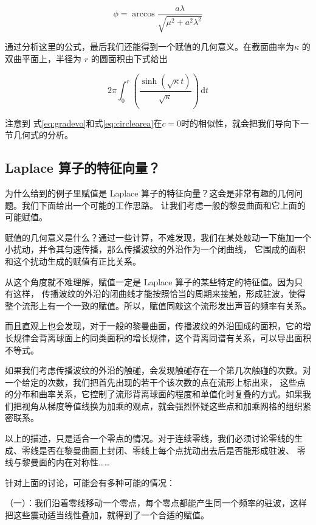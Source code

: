 \documentclass[a4paper,12pt]{article}
\numberwithin{problem}{section}
\numberwithin{definition}{section}
\numberwithin{lemma}{section}
\numberwithin{proposition}{section}
\numberwithin{theorem}{section}
\numberwithin{grammar}{section}
\numberwithin{program}{section}
\numberwithin{convention}{section}
\numberwithin{corollary}{section}
\begin{document}
\begin{equation}
    \phi = \arccos \frac{a \lambda}{\sqrt {\mu^2 + a^2 \lambda^2}}\label {eq:mulitiplcativeline}
\end{equation}

通过分析这里的公式，最后我们还能得到一个赋值的几何意义。在截面曲率为$\kappa$ 的双曲平面上，半径为 $r$ 的圆面积由下式给出

\begin{equation}
2 \pi \int_0^r \left(\frac{\sinh(\sqrt{\kappa} t)}{\sqrt{\kappa}}\right) \, \mathrm{d}t\label{eq:circlearea}
\end{equation}

注意到 式\ref{eq:gradevo}和式\ref{eq:circlearea}在$c=0$时的相似性，就会把我们导向下一节几何式的分析。

\subsection{Laplace 算子的特征向量？}

为什么给到的例子里赋值是 Laplace 算子的特征向量？这会是非常有趣的几何问题。我们下面给出一个可能的工作思路。
让我们考虑一般的黎曼曲面和它上面的可能赋值。

赋值的几何意义是什么？通过一些计算，不难发现，我们在某处敲动一下施加一个小扰动，并令其匀速传播，那么传播波纹的外沿作为一个闭曲线，
它围成的面积和这个扰动生成的赋值有正比关系。

从这个角度就不难理解，赋值一定是 Laplace 算子的某些特定的特征值。因为只有这样，
传播波纹的外沿的闭曲线才能按照恰当的周期来接触，形成驻波，使得整个流形上有一个一致的赋值。所以，赋值同敲这个流形发出声音的频率有关系。

而且直观上也会发现，对于一般的黎曼曲面，传播波纹的外沿围成的面积，它的增长规律会背离球面上的同类面积的增长规律，这个背离同谱有关系，可以导出面积不等式。

如果我们考虑传播波纹的外沿的触碰，会发现触碰存在一个第几次触碰的次数。对一个给定的次数，我们把首先出现的若干个该次数的点在流形上标出来，
这些点的分布和曲率关系，它控制了流形背离球面的程度和单值化时复叠的方式。如果我们把视角从梯度等值线换为加乘的观点，就会强烈怀疑这些点和加乘网格的组织紧密联系。

以上的描述，只是适合一个零点的情况。对于连续零线，我们必须讨论零线的生成、零线是否在黎曼曲面上封闭、零线上每个点扰动出去后是否能形成驻波、
零线与黎曼面的内在对称性……

针对上面的讨论，可能会有多种可能的情况：

（一）：我们沿着零线移动一个零点，每个零点都能产生同一个频率的驻波，这样把这些震动适当线性叠加，就得到了一个合适的赋值。
\end{document}
